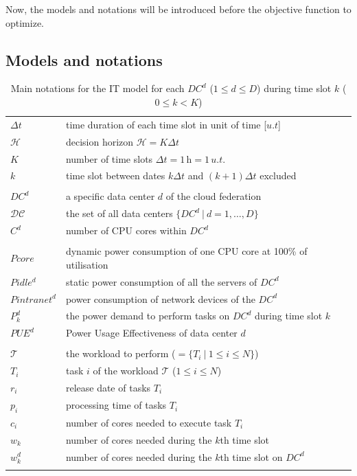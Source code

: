 Now, the models and notations will be introduced before the objective function to optimize.

\subsection{Models and notations}
\label{sec:modelsnotations_ccgrid}

\begin{table}[!t]
\caption{Main notations for the IT model for each $DC^d$ ($1\leq d\leq D$) during time slot $k$ ($0\leq k< K$)\label{table:variablesIT}}
\begin{center}
\begin{tabular}{l p{6cm}}


$\Delta t$ & time duration of each time slot in unit of time [$u.t$] \\
$\mathcal{H}$ & decision horizon $\mathcal{H} = K\Delta t$ \\
$K$ & number of time slots $\Delta t = 1\,\text{h} = 1\,u.t.$ \\ 
$k$ & time slot between dates $k\Delta t$ and $(k+1)\Delta t$ excluded \\ \\
$DC^d$ & a specific data center $d$ of the cloud federation \\
$\mathcal{DC}$ & the set of all data centers $\{DC^d \ | \ d=1, \ldots, D\}$ \\
$C^d$ & number of CPU cores within $DC^d$ \\
\\
$Pcore$ & dynamic power consumption of one CPU core at 100\% of utilisation \\
$Pidle^d$ & static power consumption of all the servers of $DC^d$ \\
$Pintranet^d$ & power consumption of network devices of the $DC^d$  \\
$P_k^d$ & the power demand to perform tasks on $DC^d$ during time slot $k$ \\ 
$PUE^d$ & Power Usage Effectiveness of data center $d$\\ 
\\
$\mathcal{T}$ & the workload to perform ($ = \{ T_i\ |\ 1\leq i\leq N\}$) \\
$T_i$ & task $i$ of the workload $\mathcal{T}$ ($1\leq i\leq N$) \\
$r_i$ & release date of tasks $T_i$\\
$p_i$ & processing time of tasks $T_i$\\
$c_i$ & number of cores needed to execute task $T_i$\\ 
$w_k$ & number of cores needed during the $k$th time slot \\
$w_k^d$ & number of cores needed during the $k$th time slot on $DC^d$\\ \\
\end{tabular}
\end{center}
\end{table}



